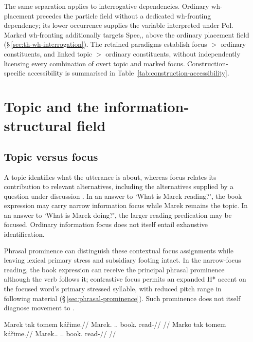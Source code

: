 The same separation applies to interrogative dependencies. Ordinary
 wh-placement precedes the particle field without a dedicated wh-fronting
 dependency; its lower occurrence supplies the variable interpreted under Pol.
 Marked wh-fronting additionally targets Spec,, above the
 ordinary placement field (§\,\ref{sec:th-wh-interrogation}). The retained
 paradigms establish focus $>$ ordinary constituents, and linked topic $>$
 ordinary constituents, without independently licensing every combination of
 overt topic and marked focus. Construction-specific accessibility is
 summarised in Table~\ref{tab:construction-accessibility}.

\section{Topic and the information-structural field}\label{sec:tc-isf}
\subsection{Topic versus focus}\label{sec:tc-focus-contrast}

A topic identifies what the utterance is about, whereas focus relates its
 contribution to relevant alternatives, including the alternatives supplied by
 a question under discussion \cite[§§\,3.1, 3.4]{krifka2008}. In an answer to
 `What is Marek reading?', the book expression may carry narrow information
 focus while Marek remains the topic. In an answer to `What is Marek doing?',
 the larger reading predication may be focused. Ordinary information focus
 does not itself entail exhaustive identification.

Phrasal prominence can distinguish these contextual focus assignments while
 leaving lexical primary stress and subsidiary footing intact. In the
 narrow-focus reading, the book expression can receive the principal phrasal
 prominence although the verb follows it; contrastive focus permits an expanded
 H* accent on the focused word's primary stressed syllable, with reduced pitch
 range in following material (§\,\ref{sec:phrasal-prominence}). Such prominence
 does not itself diagnose movement to .

\pex\label{ex:tc-top-foc}
\a\label{ex:tc-top-only}%
\begingl
\gla Marek tak tomem kářime.//
\glb Marek.\Dir{} \Dem{}.\Prox{}.\Dir{} book.\Ind{} read-\Prog{}//
\glft {}
      //
\endgl
\a\label{ex:tc-top-plus-foc}%
\begingl
\gla Marko tak tomem kářime.//
\glb Marek.\Dir{}.\Def{} \Dem{}.\Prox{}.\Dir{} book.\Ind{} read-\Prog{}//
\glft {}
      //
\endgl
\xe


